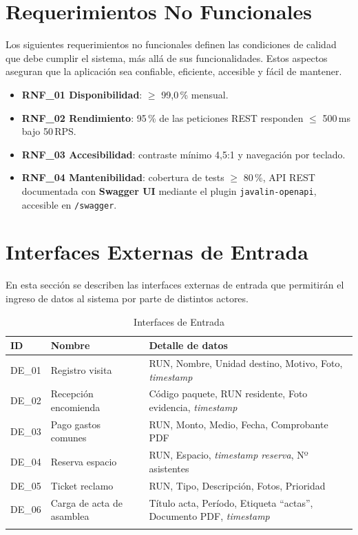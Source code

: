\section{Requerimientos No Funcionales}
Los siguientes requerimientos no funcionales definen las condiciones de calidad que debe cumplir el sistema, más allá de sus funcionalidades. Estos aspectos aseguran que la aplicación sea confiable, eficiente, accesible y fácil de mantener.

\begin{itemize}
    \item \textbf{RNF\_01 Disponibilidad}: \(\ge\) 99{,}0\,\% mensual.
    \item \textbf{RNF\_02 Rendimiento}: 95\,\% de las peticiones REST responden \(\le\) 500\,ms bajo 50\,RPS.
    \item \textbf{RNF\_03 Accesibilidad}: contraste mínimo 4{,}5:1 y navegación por teclado.
    \item \textbf{RNF\_04 Mantenibilidad}: cobertura de tests \(\ge\) 80\,\%, API REST documentada con \textbf{Swagger UI} mediante el plugin \texttt{javalin-openapi}, accesible en \texttt{/swagger}.
\end{itemize}

\section{Interfaces Externas de Entrada}
En esta sección se describen las interfaces externas de entrada que permitirán el ingreso de datos al sistema por parte de distintos actores.

{\small
\begin{longtable}{|p{}|p{}|p{}|}
\hline
\textbf{ID} & \textbf{Nombre} & \textbf{Detalle de datos} \\ \hline
DE\_01 & Registro visita & RUN, Nombre, Unidad destino, Motivo, Foto, \textit{timestamp} \\ \hline
DE\_02 & Recepción encomienda & Código paquete, RUN residente, Foto evidencia, \textit{timestamp} \\ \hline
DE\_03 & Pago gastos comunes & RUN, Monto, Medio, Fecha, Comprobante PDF \\ \hline
DE\_04 & Reserva espacio & RUN, Espacio, \textit{timestamp reserva}, Nº asistentes \\ \hline
DE\_05 & Ticket reclamo & RUN, Tipo, Descripción, Fotos, Prioridad \\ \hline
DE\_06 & Carga de acta de asamblea & Título acta, Período, Etiqueta ``actas'', Documento PDF, \textit{timestamp} \\ \hline
\caption{Interfaces de Entrada}
\label{tab:entrada}
\end{longtable}
}

